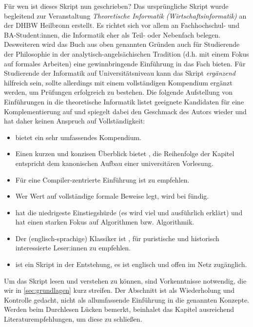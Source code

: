 Für wen ist dieses Skript nun geschrieben?
Das ursprüngliche Skript wurde begleitend zur Veranstaltung
\emph{Theoretische Informatik (Wirtschaftsinformatik)}
an der DHBW Heilbronn erstellt.
Es richtet sich vor allem an Fachhochschul- und BA-Student:innen,
die Informatik eher als Teil- oder Nebenfach belegen.
Desweiteren wird das Buch aus oben genannten Gründen auch für Studierende der Philosophie
in der analytisch-angelsächischen Tradition (d.h. mit einem Fokus auf formales Arbeiten)
eine gewinnbringende Einführung in das Fach bieten.
Für Studierende der Informatik auf Universitätsniveau kann das Skript 
\emph{ergänzend} hilfreich sein,
sollte allerdings mit einem vollständigen Kompendium ergänzt werden,
um Prüfungen erfolgreich zu bestehen.
Die folgende Aufstellung von Einführungen in die theoretische Informatik
listet geeignete Kandidaten für eine Komplementierung auf
und spiegelt dabei den Geschmack des Autors wieder
und hat daher keinen Anspruch auf Vollständigkeit:
\begin{itemize}
    \item  \cite{hoffmann} bietet ein sehr umfassendes Kompendium.
    \item  Einen kurzen und konzisen Überblick bietet \cite{schoening},
            die Reihenfolge der Kapitel entspricht dem kanonischen Aufbau
            einer universitären Vorlesung.
    \item  Für eine Compiler-zentrierte Einführung ist \cite{hedtstueck}
           zu empfehlen.
    \item  Wer Wert auf vollständige formale Beweise legt,
        wird bei \cite{erkpriese} fündig.
    \item  \cite{neubert} hat die niedrigeste Einstiegshürde (es wird viel und ausführlich erklärt) und hat einen starken Fokus auf Algorithmen bzw. Algorithmik.
    \item  Der (englisch-sprachige) Klassiker ist \cite{hopcroftullman},
        für puristische und historisch interessierte Leser:innen zu empfehlen.
    \item  \cite{barak} ist ein Skript in der Entstehung, es ist englisch und offen im Netz zugänglich.
\end{itemize}

Um das Skript lesen und verstehen zu können,
sind Vorkenntnisse notwendig,
die wir in \autoref{sec:grundlagen} kurz streifen.
Der Abschnitt ist als Wiederholung und Kontrolle gedacht,
nicht als allumfassende Einführung in die genannten Konzepte.
Werden beim Durchlesen Lücken bemerkt,
beinhalet das Kapitel ausreichend Literaturempfehlungen,
um diese zu schließen.

